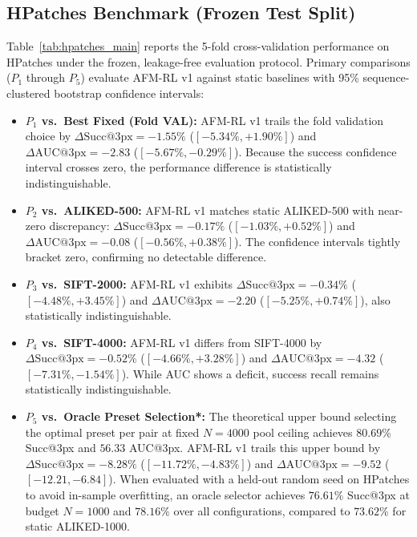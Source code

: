 \documentclass[conference]{IEEEtran}
\begin{document}
\subsection{HPatches Benchmark (Frozen Test Split)}
Table~\ref{tab:hpatches_main} reports the 5-fold cross-validation performance on HPatches under the frozen, leakage-free evaluation protocol. Primary comparisons ($P_1$ through $P_5$) evaluate AFM-RL v1 against static baselines with 95\% sequence-clustered bootstrap confidence intervals:
\begin{itemize}
    \item \textbf{$P_1$ vs.\ Best Fixed (Fold VAL):} AFM-RL v1 trails the fold validation choice by $\Delta\text{Succ}@3\text{px} = -1.55\%$ ($[-5.34\%, +1.90\%]$) and $\Delta\text{AUC}@3\text{px} = -2.83$ ($[-5.67\%, -0.29\%]$). Because the success confidence interval crosses zero, the performance difference is statistically indistinguishable.
    \item \textbf{$P_2$ vs.\ ALIKED-500:} AFM-RL v1 matches static ALIKED-500 with near-zero discrepancy: $\Delta\text{Succ}@3\text{px} = -0.17\%$ ($[-1.03\%, +0.52\%]$) and $\Delta\text{AUC}@3\text{px} = -0.08$ ($[-0.56\%, +0.38\%]$). The confidence intervals tightly bracket zero, confirming no detectable difference.
    \item \textbf{$P_3$ vs.\ SIFT-2000:} AFM-RL v1 exhibits $\Delta\text{Succ}@3\text{px} = -0.34\%$ ($[-4.48\%, +3.45\%]$) and $\Delta\text{AUC}@3\text{px} = -2.20$ ($[-5.25\%, +0.74\%]$), also statistically indistinguishable.
    \item \textbf{$P_4$ vs.\ SIFT-4000:} AFM-RL v1 differs from SIFT-4000 by $\Delta\text{Succ}@3\text{px} = -0.52\%$ ($[-4.66\%, +3.28\%]$) and $\Delta\text{AUC}@3\text{px} = -4.32$ ($[-7.31\%, -1.54\%]$). While AUC shows a deficit, success recall remains statistically indistinguishable.
    \item \textbf{$P_5$ vs.\ Oracle Preset Selection*:} The theoretical upper bound selecting the optimal preset per pair at fixed $N=4000$ pool ceiling achieves $80.69\%$ Succ@3px and $56.33$ AUC@3px. AFM-RL v1 trails this upper bound by $\Delta\text{Succ}@3\text{px} = -8.28\%$ ($[-11.72\%, -4.83\%]$) and $\Delta\text{AUC}@3\text{px} = -9.52$ ($[-12.21, -6.84]$). When evaluated with a held-out random seed on HPatches to avoid in-sample overfitting, an oracle selector achieves $76.61\%$ Succ@3px at budget $N=1000$ and $78.16\%$ over all configurations, compared to $73.62\%$ for static ALIKED-1000.
\end{itemize}
\end{document}
